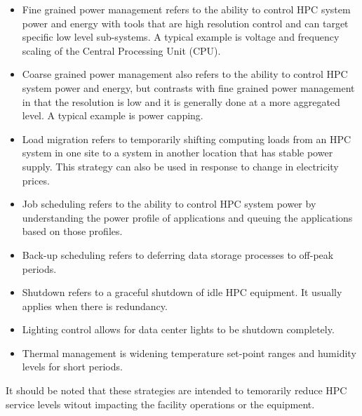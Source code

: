 \begin{itemize}
\item Fine grained power management refers to the ability to control HPC system power 
and energy with tools that are high resolution control and can target specific 
low level sub-systems. A typical example is voltage and frequency scaling of the Central Processing Unit (CPU).

\item Coarse grained power management also refers to the ability to control HPC 
system power and energy, but contrasts with fine grained power management in 
that the resolution is low and it is generally done at a more aggregated level. 
A typical example is power capping.

\item Load migration refers to temporarily shifting computing loads from 
an HPC system in one site to a system in another location that has stable power supply. 
This strategy can also be used in response to change in electricity prices.

\item Job scheduling refers to the ability to control HPC system power 
by understanding the power profile of applications and queuing the 
applications based on those profiles.

\item Back-up scheduling refers to deferring data storage processes to off-peak periods.

\item Shutdown refers to a graceful shutdown of idle HPC equipment. It usually 
applies when there is redundancy.

\item Lighting control allows for data center lights to be shutdown completely.

\item Thermal management is widening temperature set-point ranges and 
humidity levels for short periods.
\end{itemize}

It should be noted that these strategies are intended to temorarily reduce HPC service levels witout impacting the facility operations or the equipment.
